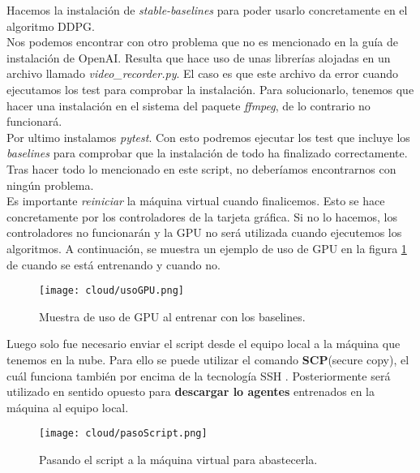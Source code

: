 \documentclass[11pt,fleqn]{book} %
\begin{document}
Hacemos la instalación de \textit{stable-baselines}\cite{article:stablebaselinesinstalation} para poder usarlo concretamente en el algoritmo DDPG. \\

Nos podemos encontrar con otro problema que no es mencionado en la guía de instalación de OpenAI. Resulta que hace uso de unas librerías alojadas en un archivo llamado \textit{video\_recorder.py}. El caso es que este archivo da error cuando ejecutamos los test para comprobar la instalación. Para solucionarlo, tenemos que hacer una instalación en el sistema del paquete \textit{ffmpeg}, de lo contrario no funcionará. \\

Por ultimo instalamos \textit{pytest}. Con esto podremos ejecutar los test que incluye los \textit{baselines} para comprobar que la instalación de todo ha finalizado correctamente. Tras hacer todo lo mencionado en este script, no deberíamos encontrarnos con ningún problema. \\

Es importante \textit{reiniciar} la máquina virtual cuando finalicemos. Esto se hace concretamente por los controladores de la tarjeta gráfica. Si no lo hacemos, los controladores no funcionarán y la GPU no será utilizada cuando ejecutemos los algoritmos. A continuación, se muestra un ejemplo de uso de GPU en la figura \ref{fig:usoGPU} de cuando se está entrenando y cuando no. \cite{article:configuration}\cite{article:configuration2}\cite{article:configuration3}\\ 

\begin{figure}[H]
	\centering\texttt{[image: cloud/usoGPU.png]}
	\caption{Muestra de uso de GPU al entrenar con los baselines.}
	\label{fig:usoGPU} %
\end{figure} 

Luego solo fue necesario enviar el script desde el equipo local a la máquina que tenemos en la nube. Para ello se puede utilizar el comando \textbf{SCP}(secure copy), el cuál funciona también por encima de la tecnología SSH \cite{article:scp}. Posteriormente será utilizado en sentido opuesto para \textbf{descargar lo agentes} entrenados en la máquina al equipo local. \\

\begin{figure}[H]
	\centering\texttt{[image: cloud/pasoScript.png]}
	\caption{Pasando el script a la máquina virtual para abastecerla.}
	\label{fig:usoSCP} %
\end{figure} 
\end{document}
